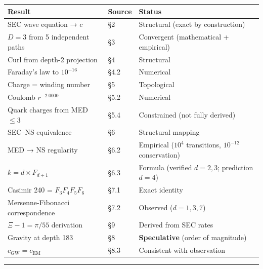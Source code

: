 \documentclass[
  11pt,
  a4paper]{article}
\begin{document}
\begin{longtable}[]{@{}
  >{\raggedright\arraybackslash}p{}
  >{\raggedright\arraybackslash}p{}
  >{\raggedright\arraybackslash}p{}@{}}
\toprule\noalign{}
\begin{minipage}[b]{\linewidth}\raggedright
Result
\end{minipage} & \begin{minipage}[b]{\linewidth}\raggedright
Source
\end{minipage} & \begin{minipage}[b]{\linewidth}\raggedright
Status
\end{minipage} \\
\midrule\noalign{}
\endhead
\bottomrule\noalign{}
\endlastfoot
SEC wave equation → \(c\) & §2 & Structural (exact by construction) \\
\(D = 3\) from 5 independent paths & §3 & Convergent (mathematical +
empirical) \\
Curl from depth-2 projection & §4 & Structural \\
Faraday's law to \(10^{-16}\) & §4.2 & Numerical \\
Charge = winding number & §5 & Topological \\
Coulomb \(r^{-2.0000}\) & §5.2 & Numerical \\
Quark charges from MED \(\leq 3\) & §5.4 & Constrained (not fully
derived) \\
SEC--NS equivalence & §6 & Structural mapping \\
MED → NS regularity & §6.2 & Empirical (\(10^4\) transitions,
\(10^{-12}\) conservation) \\
\(k = d \times F_{d+1}\) & §6.3 & Formula (verified \(d = 2, 3\);
prediction \(d = 4\)) \\
Casimir 240 = \(F_3 F_4 F_5 F_6\) & §7.1 & Exact identity \\
Mersenne-Fibonacci correspondence & §7.2 & Observed (\(d = 1, 3, 7\)) \\
\(\Xi - 1 = \pi/55\) derivation & §9 & Derived from SEC rates \\
Gravity at depth 183 & §8 & \textbf{Speculative} (order of magnitude) \\
\(c_\text{GW} = c_\text{EM}\) & §8.3 & Consistent with observation \\
\end{longtable}

\begin{center}\rule{0.5\linewidth}{0.5pt}\end{center}
\end{document}
